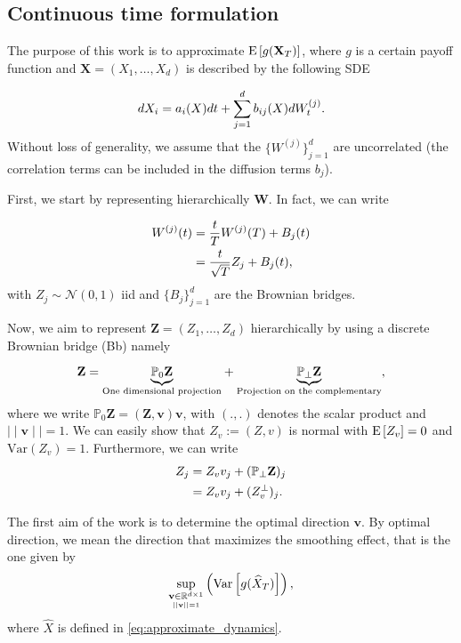 \subsection{Continuous time formulation}

The purpose of this work is to approximate $\mathrm{E}\left[g(\mathbf{X}_T)\right]$, where $g$ is a certain payoff function and $\mathbf{X}=(X_1, \dots, X_d)$ is described by the following SDE

\begin{equation}\label{eq:SDE_interest}
dX_i=a_i(X) dt + \sum_{j=1}^d b_{ij}(X) dW_t^{(j)} .
\end{equation}
Without  loss of generality, we assume that the $\{W^{(j)}\}_{j=1}^d$ are uncorrelated (the correlation terms can be included  in the diffusion terms $b_j$).

First, we start by representing hierarchically $\mathbf{W}$. In fact, we can write 

\begin{align}
W^{(j)}(t)&= \frac{t}{T} W^{(j)}(T)+B_j(t) \nonumber\\
&= \frac{t}{\sqrt{T}} Z_j+B_j(t),
\end{align}
with $Z_j \sim \mathcal{N}(0,1)$ iid and $\{B_j\}_{j=1}^d$ are the Brownian bridges.

Now, we aim to represent $\mathbf{Z}=(Z_1,\dots,Z_d)$ hierarchically by using a discrete Brownian bridge (Bb) namely

\begin{equation}\label{eq:smoothing_decomposition}
\mathbf{Z}= \underset{\text{One dimensional projection}}{\underbrace{\mathbb{P}_0 \mathbf{Z}}} +  \underset{\text{Projection on the complementary}} {\underbrace{\mathbb{P}_{\perp} \mathbf{Z}}},
\end{equation} 
where we write $\mathbb{P}_0 \mathbf{Z}=(\mathbf{Z}, \mathbf{v}) \mathbf{v}$, with $(.,.)$ denotes the scalar product and $\mid \mid \mathbf{v} \mid \mid=1$. We can easily show that $Z_v:=(Z,v)$ is normal with $\mathrm{E}\left[Z_v\right]=0$ and $\text{Var}(Z_v)=1$. Furthermore, we can write
\begin{align}\label{eq:smoothing_decomposition_componentwise}
Z_j&=Z_v v_j+ (\mathbb{P}_{\perp} \mathbf{Z})_j\nonumber \\
&=Z_v v_j+ (Z_v^\perp)_j .
\end{align}

The first aim of the work is to determine the optimal direction $\mathbf{v}$. By optimal direction, we mean the direction that maximizes the smoothing effect, that is the one given by
\begin{align}\label{optimality_criterion_2}
\underset{\underset{\mid \mid \mathbf{v}\mid \mid=1} {\mathbf{v} \in \mathbb{R}^{d \times 1}}}{\operatorname{\sup}} \left(\text{Var}\left[ g(\widehat{X}_T) \right] \right) ,
\end{align}
where $\hat{X}$ is defined in \eqref{eq:approximate_dynamics}.

